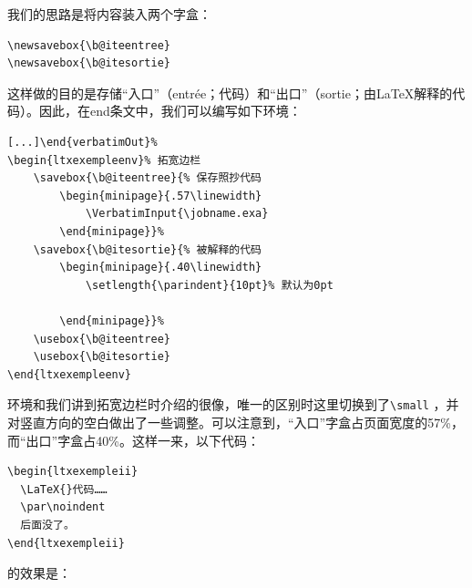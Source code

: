 我们的思路是将内容装入两个字盒：

\begin{dmd}
\begin{verbatim}
\newsavebox{\b@iteentree}
\newsavebox{\b@itesortie}\end{verbatim}
\end{dmd}

这样做的目的是存储“入口”（entrée；代码）和“出口”（sortie；由\LaTeX 解释的代码）。因此，在end条文中，我们可以编写如下环境：

\begin{dmd}
\begin{verbatim}
[...]\end{verbatimOut}%
\begin{ltxexempleenv}% 拓宽边栏
    \savebox{\b@iteentree}{% 保存照抄代码
        \begin{minipage}{.57\linewidth}
            \VerbatimInput{\jobname.exa}
        \end{minipage}}%
    \savebox{\b@itesortie}{% 被解释的代码
        \begin{minipage}{.40\linewidth} 
            \setlength{\parindent}{10pt}% 默认为0pt
            
        \end{minipage}}%
    \usebox{\b@iteentree}
    \usebox{\b@itesortie}
\end{ltxexempleenv}\end{verbatim}
\end{dmd}

环境和我们讲到拓宽边栏时介绍的很像，唯一的区别时这里切换到了\verb|\small|%
，并对竖直方向的空白做出了一些调整。可以注意到，“入口”字盒占页面宽度的57\%，而“出口”字盒占40\%。这样一来，以下代码：

\begin{dmd}
\begin{verbatim}
\begin{ltxexempleii}
  \LaTeX{}代码……
  \par\noindent
  后面没了。
\end{ltxexempleii}\end{verbatim}
\end{dmd}

的效果是：

\makeatletter%



